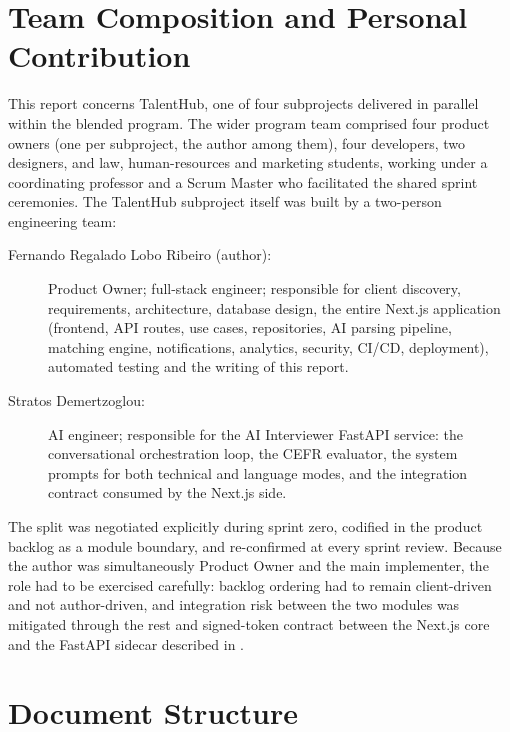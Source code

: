 
\section{Team Composition and Personal Contribution}
\label{sec:team}

This report concerns TalentHub, one of four subprojects delivered in
parallel within the \gls{blended} program. The wider program team comprised four
product owners (one per subproject, the author among them), four developers,
two designers, and law, human-resources and marketing students, working under
a coordinating professor and a Scrum Master who facilitated the shared sprint
ceremonies. The TalentHub subproject itself was built by a two-person
engineering team:

\begin{description}
	\item[Fernando Regalado Lobo Ribeiro (author):] Product Owner;
	full-stack engineer; responsible for client discovery, requirements,
	architecture, database design, the entire Next.js application
	(frontend, API routes, use cases, repositories, AI parsing pipeline,
	matching engine, notifications, analytics, security, CI/CD,
	deployment), automated testing and the writing of this report.

	\item[Stratos Demertzoglou:] AI engineer; responsible for the AI
	Interviewer FastAPI service: the conversational orchestration loop,
	the CEFR evaluator, the system prompts for both technical and
	language modes, and the integration contract consumed by the
	Next.js side.
\end{description}

The split was negotiated explicitly during sprint zero, codified in the
product backlog as a module boundary, and re-confirmed at every sprint
review. Because the author was simultaneously Product Owner and the main
implementer, the role had to be exercised carefully: backlog ordering had
to remain client-driven and not author-driven, and integration risk
between the two modules was mitigated through the \gls{rest} and
signed-token contract between the Next.js core and the FastAPI sidecar
described in .


\section{Document Structure}
\label{sec:structure}

